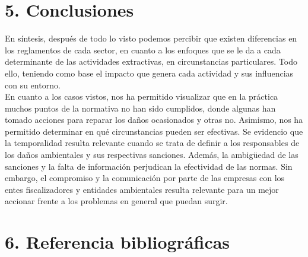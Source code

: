 \documentclass[12pt, a4paper]{article} %
\begin{document}
\begin{multicols}{2}
        \section*{5. Conclusiones}
        En síntesis, después de todo lo visto podemos percibir que existen diferencias en los reglamentos de cada sector, en cuanto a los enfoques que se le da a cada determinante de las actividades extractivas, en circunstancias particulares. Todo ello, teniendo como base el impacto que genera cada actividad y sus influencias con su entorno. \\En cuanto a los casos vistos, nos ha permitido visualizar que en la práctica muchos puntos de la normativa no han sido cumplidos, donde algunas han tomado acciones para reparar los daños ocasionados y otras no. Asimismo, nos ha permitido determinar en qué circunstancias pueden ser efectivas. Se evidencio que la temporalidad resulta relevante cuando se trata de definir a los responsables de los daños ambientales y sus respectivas sanciones. Además, la ambigüedad de las sanciones y la falta de información perjudican la efectividad de las normas. Sin embargo, el compromiso y la comunicación por parte de las empresas con los entes fiscalizadores y entidades ambientales resulta relevante para un mejor accionar frente a los problemas en general que puedan surgir.

        \section*{6. Referencia bibliográficas}
    \end{multicols}
    
\end{document}
